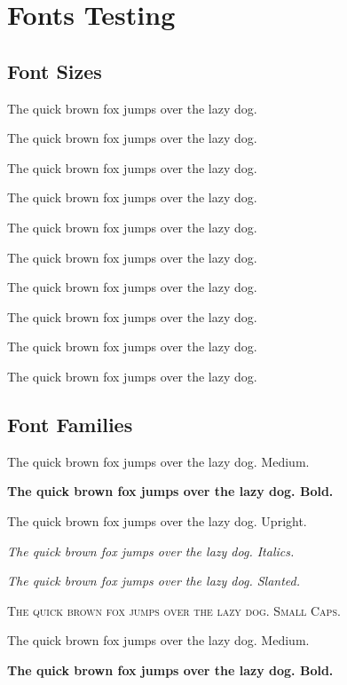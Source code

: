 \blinddocument

\chapter{Fonts Testing}

\section{Font Sizes}

{\tiny The quick brown fox jumps over the lazy dog.}

{\scriptsize The quick brown fox jumps over the lazy dog.}

{\footnotesize The quick brown fox jumps over the lazy dog.}

{\small The quick brown fox jumps over the lazy dog.}

{\normalsize The quick brown fox jumps over the lazy dog.}

{\large The quick brown fox jumps over the lazy dog.}

{\Large The quick brown fox jumps over the lazy dog.}

{\LARGE The quick brown fox jumps over the lazy dog.}

{\huge The quick brown fox jumps over the lazy dog.}

{\Huge The quick brown fox jumps over the lazy dog.}


\section{Font Families}

\sffamily\blindtext

\textmd{The quick brown fox jumps over the lazy dog. Medium.}

\textbf{The quick brown fox jumps over the lazy dog. Bold.}

\textup{The quick brown fox jumps over the lazy dog. Upright.}

\textit{The quick brown fox jumps over the lazy dog. Italics.}

\textsl{The quick brown fox jumps over the lazy dog. Slanted.}

\textsc{The quick brown fox jumps over the lazy dog. Small Caps.}

\ttfamily\blindtext

\textmd{The quick brown fox jumps over the lazy dog. Medium.}

\textbf{The quick brown fox jumps over the lazy dog. Bold.}


